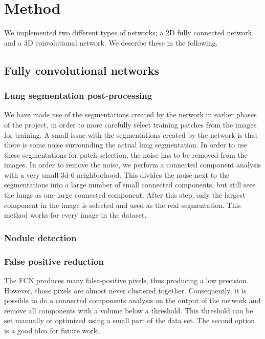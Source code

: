 \documentclass{article}
\begin{document}
\section{Method}\label{sec:method} 
We implemented two different types of networks; a 2D fully connected network and a 3D convolutional network. We describe these in the following.

\subsection{Fully convolutional networks}
\subsubsection{Lung segmentation post-processing}
We have made use of the segmentations created by the network in earlier phases of the project, in order to more carefully select training patches from the images for training. A small issue with the segmentations created by the network is that there is some noise surrounding the actual lung segmentation. In order to use these segmentations for patch selection, the noise has to be removed from the images. In order to remove the noise, we perform a connected component analysis with a very small 3d-6 neighborhood. This divides the noise next to the segmentations into a large number of small connected components, but still sees the lungs as one large connected component. After this step, only the largest component in the image is selected and used as the real segmentation. This method works for every image in the dataset.
\cite{long}

\subsubsection{Nodule detection}
\label{sec:fcn}


\subsubsection{False positive reduction}
The FCN produces many false-positive pixels, thus producing a low precision. However, those pixels are almost never clustered together. Consequently, it is possible to do a connected components analysis on the output of the network and remove all components with a volume below a threshold. This threshold can be set manually or optimized using a small part of the data set. The second option is a good idea for future work.
\end{document}
